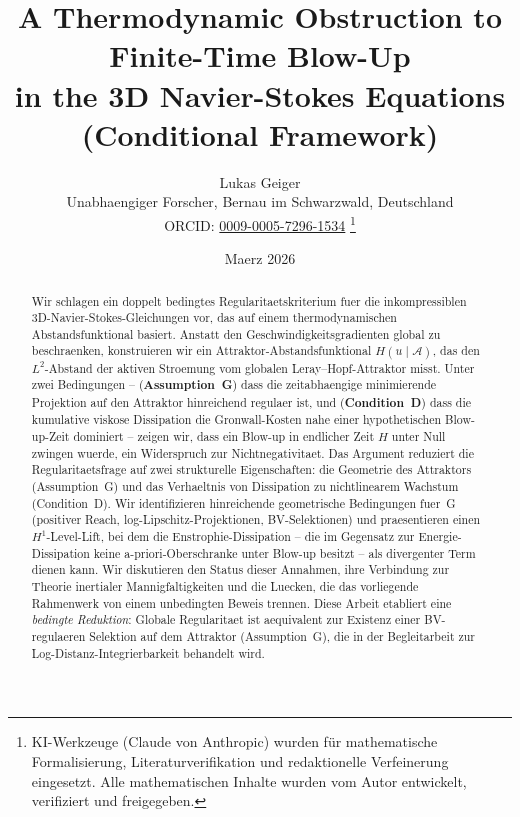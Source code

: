 \documentclass[12pt,a4paper]{article}
\title{\textbf{A Thermodynamic Obstruction to Finite-Time Blow-Up\\ in the 3D Navier-Stokes Equations (Conditional Framework)}}
\author{Lukas Geiger\\
\small Unabhaengiger Forscher, Bernau im Schwarzwald, Deutschland\\
\small ORCID: \href{https://orcid.org/0009-0005-7296-1534}{0009-0005-7296-1534}%
\thanks{KI-Werkzeuge (Claude von Anthropic) wurden f\"ur mathematische Formalisierung, Literaturverifikation und redaktionelle Verfeinerung eingesetzt. Alle mathematischen Inhalte wurden vom Autor entwickelt, verifiziert und freigegeben.}}
\date{Maerz 2026}
\theoremstyle{definition}
\theoremstyle{plain}
\theoremstyle{remark}
\begin{document}
\maketitle

\begin{abstract}
Wir schlagen ein doppelt bedingtes Regularitaetskriterium fuer die inkompressiblen 3D-Navier-Stokes-Gleichungen vor, das auf einem thermodynamischen Abstandsfunktional basiert. Anstatt den Geschwindigkeitsgradienten global zu beschraenken, konstruieren wir ein Attraktor-Abstandsfunktional $H(u \mid \mathcal{A})$, das den $L^2$-Abstand der aktiven Stroemung vom globalen Leray--Hopf-Attraktor misst. Unter zwei Bedingungen -- (\textbf{Assumption~G}) dass die zeitabhaengige minimierende Projektion auf den Attraktor hinreichend regulaer ist, und (\textbf{Condition~D}) dass die kumulative viskose Dissipation die Gronwall-Kosten nahe einer hypothetischen Blow-up-Zeit dominiert -- zeigen wir, dass ein Blow-up in endlicher Zeit $H$ unter Null zwingen wuerde, ein Widerspruch zur Nichtnegativitaet. Das Argument reduziert die Regularitaetsfrage auf zwei strukturelle Eigenschaften: die Geometrie des Attraktors (Assumption~G) und das Verhaeltnis von Dissipation zu nichtlinearem Wachstum (Condition~D). Wir identifizieren hinreichende geometrische Bedingungen fuer~G (positiver Reach, log-Lipschitz-Projektionen, BV-Selektionen) und praesentieren einen $H^1$-Level-Lift, bei dem die Enstrophie-Dissipation -- die im Gegensatz zur Energie-Dissipation keine a-priori-Oberschranke unter Blow-up besitzt -- als divergenter Term dienen kann. Wir diskutieren den Status dieser Annahmen, ihre Verbindung zur Theorie inertialer Mannigfaltigkeiten und die Luecken, die das vorliegende Rahmenwerk von einem unbedingten Beweis trennen.
Diese Arbeit etabliert eine \emph{bedingte Reduktion}: Globale Regularitaet ist aequivalent zur Existenz einer BV-regulaeren Selektion auf dem Attraktor (Assumption~G), die in der Begleitarbeit zur Log-Distanz-Integrierbarkeit \cite{Geiger2026-LDI} behandelt wird.
\end{abstract}
\end{document}
